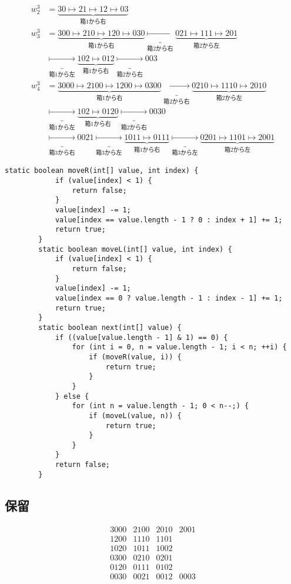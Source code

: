 	\begin{equation*}\begin{split} %
		w_2^3 
		&= \underbrace{30\mapsto21\mapsto12\mapsto03}_{\text{箱$1$から右}} \\
		w_3^3
		&= \underbrace{300\mapsto210\mapsto120\mapsto030}_{\text{箱$1$から右}}
		\underbrace{\mapsto}_{\text{箱$2$から右}}
		\underbrace{021\mapsto111\mapsto201}_{\text{箱$2$から左}} \\
		&\underbrace{\mapsto}_{\text{箱$1$から左}}
		\underbrace{102\mapsto012}_{\text{箱$1$から右}}
		\underbrace{\mapsto}_{\text{箱$2$から右}}
		003 \\
		w_4^3
		&= \underbrace{3000\mapsto2100\mapsto1200\mapsto0300}_{\text{箱$1$から右}}
		\underbrace{\mapsto}_{\text{箱$2$から右}}
		\underbrace{0210\mapsto1110\mapsto2010}_{\text{箱$2$から左}} \\
		&\underbrace{\mapsto}_{\text{箱$1$から左}}
		\underbrace{102\mapsto0120}_{\text{箱$1$から右}}
		\underbrace{\mapsto}_{\text{箱$2$から右}}
		0030 \\
		&\underbrace{\mapsto}_{\text{箱$3$から右}}
		0021 
		\underbrace{\mapsto}_{\text{箱$3$から左}}
		\underbrace{1011\mapsto0111}_{\text{箱$1$から右}}
		\underbrace{\mapsto}_{\text{箱$3$から左}}
		\underbrace{0201\mapsto1101\mapsto2001}_{\text{箱$2$から左}}
	\end{split}\end{equation*} %

	\begin{lstlisting}[caption=箱の数が２または３の場合, label=code:箱の数が２または３の場合]
		static boolean moveR(int[] value, int index) {
			if (value[index] < 1) {
				return false;
			}
			value[index] -= 1;
			value[index == value.length - 1 ? 0 : index + 1] += 1;
			return true;
		}
		static boolean moveL(int[] value, int index) {
			if (value[index] < 1) {
				return false;
			}
			value[index] -= 1;
			value[index == 0 ? value.length - 1 : index - 1] += 1;
			return true;
		}
		static boolean next(int[] value) {
			if ((value[value.length - 1] & 1) == 0) {
				for (int i = 0, n = value.length - 1; i < n; ++i) {
					if (moveR(value, i)) {
						return true;
					}
				}
			} else {
				for (int n = value.length - 1; 0 < n--;) {
					if (moveL(value, n)) {
						return true;
					}
				}
			}
			return false;
		}
	\end{lstlisting}

\subsection{保留}\label{s2:保留} %
	\begin{equation*}\begin{matrix} %
		3000 & 2100 & 2010 & 2001 \\
		1200 & 1110 & 1101 \\
		1020 & 1011 & 1002 \\
		0300 & 0210 & 0201 \\
		0120 & 0111 & 0102 \\
		0030 & 0021 & 0012 & 0003 \\
	\end{matrix}\end{equation*} %

